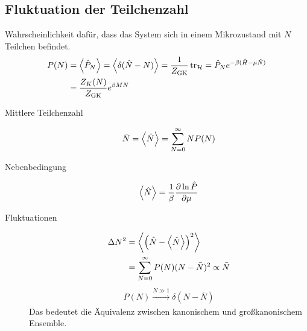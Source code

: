 \documentclass[11pt]{article}
\theoremstyle{plain}
\theoremstyle{mytheoremstyle}
\newcommand{\pd}[2]{\frac{\partial #1 }{\partial #2}}
\newcommand{\trace}{\operatorname{tr}}
\begin{document}
\subsection*{Fluktuation der Teilchenzahl}
%
 Wahrscheinlichkeit daf\"ur, dass das System sich in einem Mikrozustand mit 
 $N$ Teilchen befindet.
\begin{align*}
    P(N)  & = 
     \Braket{\hat{P}_N} = \Braket{\delta (\hat{N} - N)} 
  = \frac{1}{Z_{\text{GK}}} \trace_{\mathcal{H}} = \hat{P}_N
  e ^{-\beta (\hat{H} - \mu \hat{N})} \\ & = 
  \frac{Z_K(N)}{Z_{\text{GK}}} e^{\beta M N}
\end{align*}
%
\begin{description}
  \item [Mittlere Teilchenzahl]
  \begin{align*}
    \bar{N} = \Braket{\hat{N}} = \sum_{N=0}^{\infty} N P(N)
  \end{align*}
\item[Nebenbedingung]
  \begin{align*}
    \Braket{\hat{N}} = \frac{1}{\beta} \pd{\ln{\hat{P}}}{\mu}
  \end{align*}
\item[Fluktuationen] 

  \begin{align*}
    \Delta N^2 & = \Braket{\left( \hat{N} - \Braket{\hat{N}} \right)^2} \\ 
               & = \sum_{N = 0 }^{\infty} P(N) (N - \bar{N})^2 \propto \bar{N}
  \end{align*}
  \begin{align*}
    P(N) \xrightarrow{N \gg 1} \delta (N - \bar{N})
  \end{align*}
  Das bedeutet die \"Aquivalenz zwischen kanonischem und gro\ss{}kanonischem
  Ensemble.
\end{description}
\end{document}
